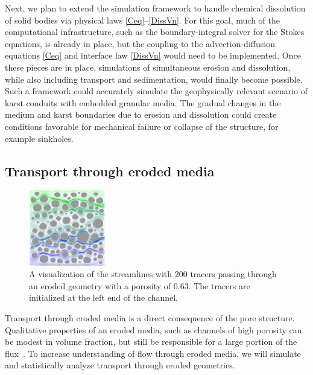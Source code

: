 \documentclass[11pt]{article}
\begin{document}
Next, we plan to extend the simulation framework to handle chemical dissolution of solid bodies via physical laws \eqref{Ceq}--\eqref{DissVn}. For this goal, much of the computational infrastructure, such as the boundary-integral solver for the Stokes equations, is already in place, but the coupling to the advection-diffusion equations \eqref{Ceq} and interface law \eqref{DissVn} would need to be implemented. Once these pieces are in place, simulations of simultaneous erosion and dissolution, while also including transport and sedimentation, would finally become possible. Such a framework could accurately simulate the geophysically relevant scenario of karst conduits with embedded granular media. The gradual changes in the medium and karst boundaries due to erosion and dissolution could create conditions favorable for mechanical failure or collapse of the structure, for example sinkholes.


 
\subsection{Transport through eroded media}

\begin{figure}
  \includegraphics[width=0.3\textwidth]{figs/100b_t100tracer}
  \caption{\label{fig:100tracers} A visualization of the streamlines
  with 200 tracers passing through an eroded geometry with a porosity of
  0.63. The tracers are initialized at the left end of the channel.}
\end{figure}

Transport through eroded media is a direct consequence of the pore
structure. Qualitative properties of an eroded media, such as channels
of high porosity can be modest in volume fraction, but still be
responsible for a large portion of the flux~\cite{Quaife2018}. To
increase understanding of flow through eroded media, we will simulate
and statistically analyze transport through eroded geometries.
\end{document}
